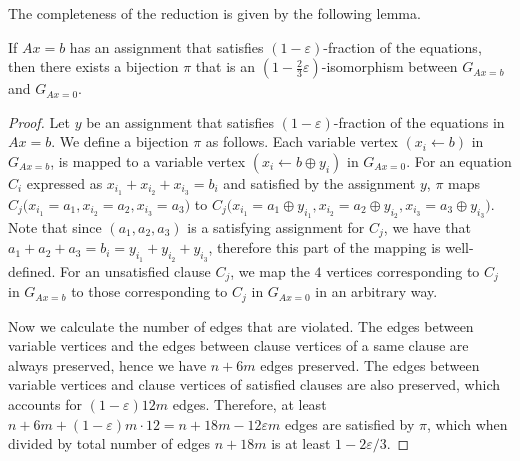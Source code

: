 \documentclass[a4paper,twoside,justified]{tufte-handout}
\begin{document}
The completeness of the reduction is given by the following lemma.
\begin{lemma}\label{lemma:completeness}
  If $Ax=b$ has an assignment that satisfies $(1-\varepsilon)$-fraction of the equations,
  then there exists a bijection $\pi$ that is an $(1-\frac{2}{3}\varepsilon)$-isomorphism between 
  $G_{Ax=b}$ and $G_{Ax=0}$.
\end{lemma}
\begin{proof}
  Let $y$ be an assignment that satisfies $(1-\varepsilon)$-fraction of the equations in $Ax=b$. We define
  a bijection $\pi$ as follows.
  Each variable vertex $(x_i \leftarrow b)$ in $G_{Ax=b}$, is mapped to 
  a variable vertex $(x_i \leftarrow b \oplus y_i)$
  in $G_{Ax=0}$. For an equation $C_i$ expressed as $x_{i_1}+x_{i_2}+x_{i_3}=b_i$ and
  satisfied by the assignment $y$, $\pi$ maps
  $C_j \bigl( x_{i_1} = a_1, x_{i_2} = a_2, x_{i_3} = a_3 \bigr)$ to $C_j \bigl( x_{i_1} = a_1 \oplus y_{i_1}, x_{i_2} = a_2 \oplus y_{i_2}, x_{i_3} = a_3 \oplus y_{i_3} \bigr)$.
  Note that since $(a_1, a_2, a_3)$ is a satisfying assignment for $C_j$, we have that
  $a_1 + a_2 + a_3 = b_i = y_{i_1} + y_{i_2} + y_{i_3}$, therefore this part of the mapping is well-defined.
  For an unsatisfied clause $C_j$, we map the $4$ vertices corresponding to $C_j$ in $G_{Ax=b}$
  to those corresponding to $C_j$ in $G_{Ax=0}$ in an arbitrary way.

  Now we calculate the number of edges that are violated. The edges between variable vertices and the edges between
  clause vertices of a same clause are always preserved, hence we have $n + 6 m$ edges preserved. The edges between variable vertices and clause vertices
  of satisfied clauses are also preserved, which accounts for $(1 - \varepsilon) 12 m$ edges.
  Therefore, at least $n+6m+(1-\varepsilon)m \cdot 12=n+18m-12\varepsilon m$ edges
  are satisfied by $\pi$, which when divided by total number of edges $n + 18m$ is at least
  $1 - 2\varepsilon / 3$.
\end{proof}
\end{document}
